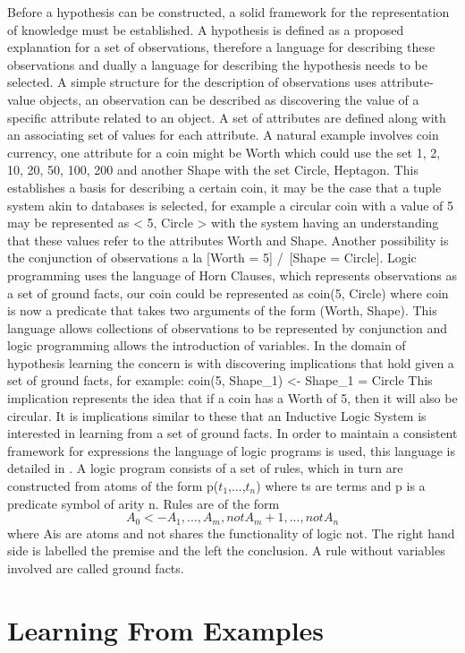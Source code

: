 \documentclass{article}
\begin{document}
Before a hypothesis can be constructed, a solid framework for the representation of knowledge must be established. A hypothesis is defined as a proposed explanation for a set of observations, therefore a language for describing these observations and dually a language for describing the hypothesis needs to be selected.
A simple structure for the description of observations uses attribute-value objects, an observation can be described as discovering the value of a specific attribute related to an object. A set of attributes are defined along with an associating set of values for each attribute. A natural example involves coin currency, one attribute for a coin might be Worth which could use the set {1, 2, 10, 20, 50, 100, 200} and another Shape with the set {Circle, Heptagon}. This establishes a basis for describing a certain coin, it may be the case that a tuple system akin to databases is selected, for example a circular coin with a value of 5 may be represented as < 5, Circle > with the system having an understanding that these values refer to the attributes Worth and Shape. Another possibility is the conjunction of observations a la [Worth = 5] /\ [Shape = Circle]. Logic programming uses the language of Horn Clauses, which represents observations as a set of ground facts, our coin could be represented as coin(5, Circle) where coin is now a predicate that takes two arguments of the form (Worth, Shape). This language allows collections of observations to be represented by conjunction and logic programming allows the introduction of variables. In the domain of hypothesis learning the concern is with discovering implications that hold given a set of ground facts, for example:
  coin(5, Shape_1) <- Shape_1 = Circle
This implication represents the idea that if a coin has a Worth of 5, then it will also be circular. It is implications similar to these that an Inductive Logic System is interested in learning from a set of ground facts.
In order to maintain a consistent framework for expressions the language of logic programs is used, this language is detailed in \cite{lpakr}.
A logic program consists of a set of rules, which in turn are constructed from atoms of the form p($t_1$,...,$t_n$) where ts are terms and p is a predicate symbol of arity n. Rules are of the form
  $$ A_0 <- A_1,...,A_m,not A_m+1,...,not A_n $$
where Ais are atoms and not shares the functionality of logic not. The right hand side is labelled the premise and the left the conclusion. A rule without variables involved are called ground facts.

\section{Learning From Examples}
\end{document}
